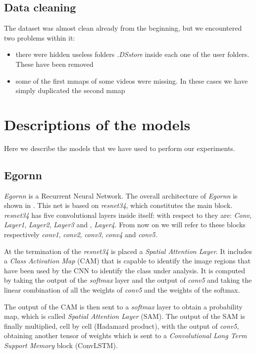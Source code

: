 \documentclass[10pt,twocolumn,hidelinks,letterpaper]{article}
\begin{document}
\subsection{Data cleaning}

The dataset was almost clean already from the beginning, but we encountered two problems within it:
\begin{itemize}
  \item there were hidden useless folders \textit{.DSstore} inside each one of the user folders. These have been removed
  \item some of the first mmaps of some videos were missing. In these cases we have simply duplicated the second mmap
\end{itemize}

\section{Descriptions of the models}

Here we describe the models that we have used to perform our experiments.

\subsection{Egornn}

\textit{Egornn} is a Recurrent Neural Network. The overall architecture of \textit{Egornn} is shown in . This net is based on \textit{resnet34}\cite{resnet}, which constitutes the main block. \textit{resnet34} has five convolutional layers inside itself: with respect to  they are: \textit{Conv}, \textit{Layer1}, \textit{Layer2}, \textit{Layer3} and , \textit{Layer4}. From now on we will refer to these blocks respectively \textit{conv1}, \textit{conv2}, \textit{conv3}, \textit{conv4} and \textit{conv5}.

At the termination of the \textit{resnet34} is placed a \textit{Spatial Attention Layer}. It includes a \textit{Class Activation Map} (CAM) that is capable to identify the image regions that have been used by the CNN to identify the class under analysis. It is computed by taking the output of the \textit{softmax} layer and the output of \textit{conv5} and taking the linear combination of all the weights of \textit{conv5} and the weights of the softmax.


The output of the CAM is then sent to a \textit{softmax} layer to obtain a probability map, which is called \textit{Spatial Attention Layer} (SAM). The output of the SAM is finally multiplied, cell by cell (Hadamard product), with the output of \textit{conv5}, obtaining another tensor of weights which is sent to a \textit{Convolutional Long Term Support Memory} block (ConvLSTM).
\end{document}
